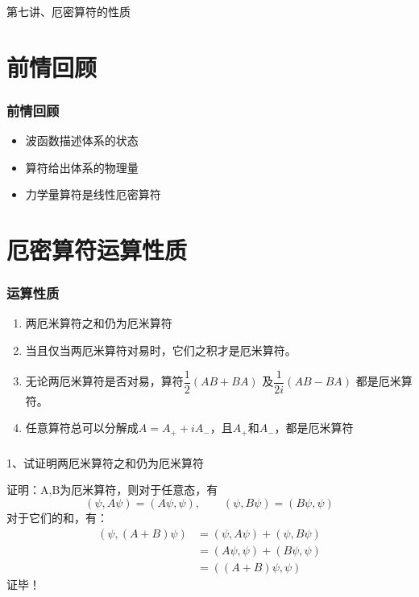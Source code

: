 \begin{frame}
    \frametitle{}
    \begin{center}
    { {\huge 第七讲、厄密算符的性质}}
    \end{center}    
\end{frame}


\section{前情回顾}

\begin{frame}
    \frametitle{前情回顾}
    \begin{itemize}
        \item 波函数描述体系的状态
        \item 算符给出体系的物理量
        \item 力学量算符是线性厄密算符
    \end{itemize}
\end{frame} 

\section{厄密算符运算性质}

\begin{frame}
    \frametitle{运算性质}
    \begin{enumerate}
        \item 两厄米算符之和仍为厄米算符
        \item 当且仅当两厄米算符对易时，它们之积才是厄米算符。
        \item 无论两厄米算符是否对易，算符$\dfrac{1}{2}(AB+BA)$ 及$\dfrac{1}{2i}(AB-BA) $  都是厄米算符。
        \item 任意算符总可以分解成$A=A_+ +iA_-$，且$A_+$和$A_-$，都是厄米算符
    \end{enumerate}
\end{frame} 

\begin{frame} [allowframebreaks=]
    \frametitle{}
    \begin{exampleblock}{}
        1、试证明两厄米算符之和仍为厄米算符
    \end{exampleblock}
    \alert{证明：}A,B为厄米算符，则对于任意态，有\\
    $$(\psi, A\psi ) = (A\psi, \psi), \qquad (\psi, B\psi ) = (B\psi, \psi)$$
    对于它们的和，有： \\
    \begin{equation*}
        \begin{split}
            (\psi, (A+B)\psi ) &= (\psi, A\psi ) + (\psi, B\psi ) \\  
            &=(A\psi, \psi ) + (B\psi, \psi ) \\
            &=((A+B)\psi, \psi ) 
         \end{split}
    \end{equation*}  
    证毕！
\end{frame} 


